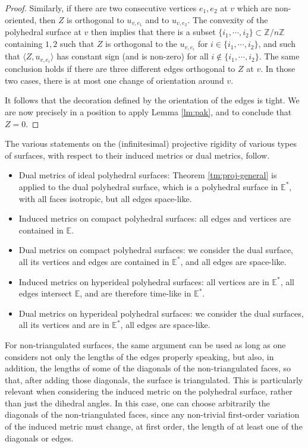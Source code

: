 \documentclass[notitlepage,twoside,a4paper]{amsart}
\theoremstyle{named}
\newcommand{\Z}{{\mathbb Z}}
\newcommand{\bE}{{\mathbb E}}
\newcounter{notes}%
\newcommand{\marginnote}[1]{
\refstepcounter{notes}  %
\nolinebreak
$\hspace{-5pt}{}^{\text{\tiny \rm \arabic{notes}}}$
\marginpar{\tiny \arabic{notes}) #1}
}
\begin{document}
\begin{proof}
  Similarly, if there are two consecutive vertices $e_1, e_2$ at $v$ which are non-oriented, then $Z$ is orthogonal to $u_{v,e_1}$ and to $u_{v,e_2}$. The convexity of the polyhedral surface at $v$ then implies that there is a subset $\{ i_1, \cdots, i_2\}\subset \Z/n\Z$ containing $1,2$ such that $Z$ is orthogonal to the $u_{v,e_i}$ for $i\in \{ i_1, \cdots, i_2\}$, and such that $\langle Z, u_{v,e_i}\rangle$ has constant sign (and is non-zero) for all $i\not\in \{ i_1, \cdots, i_2\}$. The same conclusion holds if there are three different edges orthogonal to $Z$ at $v$. In those two cases, there is at most one change of orientation around $v$.
  
  It follows that the decoration defined by the orientation of the edges is tight. We are now precisely in a position to apply Lemma \ref{lm:pak}, and to conclude that $Z=0$. 
\end{proof}

\medskip

The various statements on the (infinitesimal) projective rigidity of various types of surfaces, with respect to their induced metrics or dual metrics, follow.
\begin{itemize}
\item Dual metrics of ideal polyhedral surfaces: Theorem \ref{tm:proj-general} is applied to the dual polyhedral surface, which is a polyhedral surface in $\bE^*$, with all faces isotropic, but all edges space-like.
\item Induced metrics on compact polyhedral surfaces: all edges and vertices are contained in $\bE$.
\item Dual metrics on compact polyhedral surfaces: we consider the dual surface, all its vertices and edges are contained in $\bE^*$, and all edges are space-like.
\item Induced metrics on hyperideal polyhedral surfaces: all vertices are in $\bE^*$, all edges intersect $\bE$, and are therefore time-like in $\bE^*$.
\item Dual metrics on hyperideal polyhedral surfaces: we consider the dual surfaces, all its vertices and are in $\bE^*$, all edges are space-like.
\end{itemize}

For non-triangulated surfaces, the same argument can be used as long as one considers not only the lengths of the edges properly speaking, but also, in addition, the lengths of some of the diagonals of the non-triangulated faces, so that, after adding those diagonals, the surface is triangulated. This is particularly relevant when considering the induced metric on the polyhedral surface, rather than just the dihedral angles. In this case, one can choose arbitrarily the diagonals of the non-triangulated faces, since any non-trivial first-order variation of the induced metric must change, at first order, the length of at least one of the diagonals or edges. %
\end{document}

